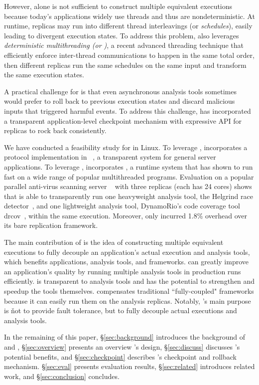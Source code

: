 However, \smr alone is not sufficient to construct multiple equivalent 
executions because today's applications widely use threads and thus are 
nondeterministic. At runtime, replicas may run into different thread
interleavings (or \emph{schedules}), easily leading to divergent execution
states. To address this problem, \xxx also leverages \emph{deterministic
multithreading (or \dmt)}, a recent advanced threading technique that
efficiently enforce inter-thread communications to happen in the same total
order, then different replicas run the same schedules on the same input and
transform the same execution states.


A practical challenge for \xxx is that even asynchronous analysis tools
sometimes would prefer to roll back to previous execution states and discard 
malicious inputs that triggered harmful events. To address this challenge, \xxx 
has incorporated a transparent application-level checkpoint mechanism with 
expressive API for replicas to rock back consistently.


We have conducted a feasibility study for \xxx in Linux. To leverage \smr, \xxx 
incorporates a \paxos protocol implementation in \repbox~\cite{repbox:sosp15}, a 
transparent \smr system for general server applications. To leverage \dmt, \xxx 
incorporates \parrot, a \dmt runtime system that has shown to run fast on a wide 
range of popular multithreaded programs. Evaluation on a popular parallel 
anti-virus scanning server \clamav~\cite{clamav} with three replicas (each has 24 
cores) shows that \xxx is able to transparently run one heavyweight analysis 
tool, the Helgrind race detector~\cite{valgrind:pldi}, and one lightweight 
analysis tool, DynamoRio's code coverage tool drcov~\cite{dynamorio}, within 
the same execution. Moreover, \xxx only incurred 1.8\% overhead over its bare 
replication framework.


The main contribution of \xxx is the idea of constructing multiple equivalent
executions to fully decouple an application's actual execution and analysis
tools, which benefits applications, analysis tools, and frameworks. \xxx can
greatly improve an application's quality by running multiple analysis tools in
production runs efficiently. \xxx is transparent to analysis tools and has the
potential to strengthen and speedup the tools themselves. \xxx compensates 
traditional ``fully-coupled" frameworks because it can easily run them on the 
analysis replicas. Notably, \xxx's main purpose is \v{not} to provide fault 
tolerance, but to fully decouple actual executions and analysis tools.

In the remaining of this paper, \S\ref{sec:background} introduces the 
background of \smr and \dmt, \S\ref{sec:overview} presents an overview \xxx's 
design, \S\ref{sec:discuss} discusses \xxx's potential benefits, and 
\S\ref{sec:checkpoint} describes \xxx's checkpoint and rollback mechanism. 
\S\ref{sec:eval} presents evaluation results, \S\ref{sec:related} introduces 
related work, and \S\ref{sec:conclusion} concludes.